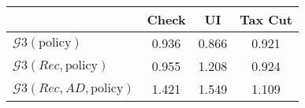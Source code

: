 \begin{tabular}{@{}lccc@{}}
\toprule
                          & Check      & UI    & Tax Cut    \\  \midrule
$\mathcal{G}3(\text{policy})$ & 0.936  & 0.866  & 0.921     \\
$\mathcal{G}3(Rec,\text{policy})$ & 0.955  & 1.208  & 0.924     \\
$\mathcal{G}3(Rec, AD,\text{policy})$ & 1.421  & 1.549  & 1.109     \\
\end{tabular}
